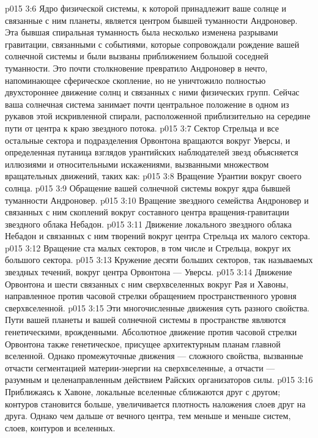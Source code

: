 \vs p015 3:6 Ядро физической системы, к которой принадлежит ваше солнце и связанные с ним планеты, является центром бывшей туманности Андроновер. Эта бывшая спиральная туманность была несколько изменена разрывами гравитации, связанными с событиями, которые сопровождали рождение вашей солнечной системы и были вызваны приближением большой соседней туманности. Это почти столкновение превратило Андроновер в нечто, напоминающее сферическое скопление, но не уничтожило полностью двухстороннее движение солнц и связанных с ними физических групп. Сейчас ваша солнечная система занимает почти центральное положение в одном из рукавов этой искривленной спирали, расположенной приблизительно на середине пути от центра к краю звездного потока.
\vs p015 3:7 \pc Сектор Стрельца и все остальные сектора и подразделения Орвонтона вращаются вокруг Уверсы, и определенная путаница взглядов урантийских наблюдателей звезд объясняется иллюзиями и относительными искажениями, вызванными множеством вращательных движений, таких как:
\vs p015 3:8 \bibnobreakspace Вращение Урантии вокруг своего солнца.
\vs p015 3:9 \bibnobreakspace Обращение вашей солнечной системы вокруг ядра бывшей туманности Андроновер.
\vs p015 3:10 \bibnobreakspace Вращение звездного семейства Андроновер и связанных с ним скоплений вокруг составного центра вращения\hyp{}гравитации звездного облака Небадон.
\vs p015 3:11 \bibnobreakspace Движение локального звездного облака Небадон и связанных с ним творений вокруг центра Стрельца их малого сектора.
\vs p015 3:12 \bibnobreakspace Вращение ста малых секторов, в том числе и Стрельца, вокруг их большого сектора.
\vs p015 3:13 \bibnobreakspace Кружение десяти больших секторов, так называемых звездных течений, вокруг центра Орвонтона --- Уверсы.
\vs p015 3:14 \bibnobreakspace Движение Орвонтона и шести связанных с ним сверхвселенных вокруг Рая и Хавоны, направленное против часовой стрелки обращением пространственного уровня сверхвселенной.
\vs p015 3:15 \pc Эти многочисленные движения суть разного свойства. Пути вашей планеты и вашей солнечной системы в пространстве являются генетическими, врожденными. Абсолютное движение против часовой стрелки Орвонтона также генетическое, присущее архитектурным планам главной вселенной. Однако промежуточные движения --- сложного свойства, вызванные отчасти сегментацией материи\hyp{}энергии на сверхвселенные, а отчасти --- разумным и целенаправленным действием Райских организаторов силы.
\vs p015 3:16 \pc Приближаясь к Хавоне, локальные вселенные сближаются друг с другом; контуров становится больше, увеличивается плотность наложения слоев друг на друга. Однако чем дальше от вечного центра, тем меньше и меньше систем, слоев, контуров и вселенных.
